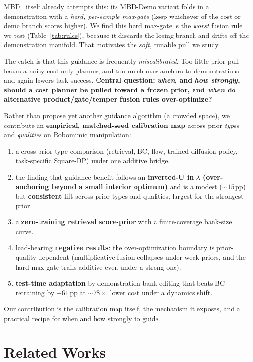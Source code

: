 \documentclass[letterpaper, 10 pt, conference]{ieeeconf}
\begin{document}
MBD~\cite{mbd} itself already attempts this: its \mbox{MBD-Demo} variant
folds in a demonstration with a \emph{hard, per-sample max-gate} (keep
whichever of the cost or demo branch scores higher). We find this hard
max-gate is the
\emph{worst} fusion rule we test (Table~\ref{tab:rules}), because it
discards the losing branch and drifts off the demonstration manifold. That
motivates the \emph{soft}, tunable pull we study.

The catch is that this guidance is frequently \emph{miscalibrated}. Too
little prior pull leaves a noisy cost-only planner, and too much
over-anchors to demonstrations and again lowers task success. \textbf{Central question:
\emph{when}, and \emph{how strongly}, should a cost planner be pulled
toward a frozen prior, and \emph{when} do alternative product/gate/temper
fusion rules over-optimize?}

Rather than propose yet another guidance algorithm (a crowded space), we
contribute an \textbf{empirical, matched-seed calibration map} across
prior \emph{types} and \emph{qualities} on Robomimic manipulation:
\begin{enumerate}\itemsep -1pt
\item a cross-prior-type comparison (retrieval, BC, flow, trained
diffusion policy, task-specific Square-DP) under one additive bridge.
\item the finding that guidance benefit follows an \textbf{inverted-U in
$\lambda$ (over-anchoring beyond a small interior optimum)} and is a
modest ($\sim\!15$\,pp) but \textbf{consistent} lift across prior types
and qualities, largest for the strongest prior.
\item a \textbf{zero-training retrieval score-prior} with a
finite-coverage bank-size curve.
\item load-bearing \textbf{negative results}: the over-optimization
boundary is prior-quality-dependent (multiplicative fusion collapses under
weak priors, and the hard max-gate trails additive even under a strong one).
\item \textbf{test-time adaptation} by demonstration-bank editing that
beats BC retraining by $+61$\,pp at $\sim\!78\times$ lower cost under a
dynamics shift.
\end{enumerate}
Our contribution is the calibration map itself, the mechanism it exposes,
and a practical recipe for when and how strongly to guide.

\section{Related Works}
\end{document}
